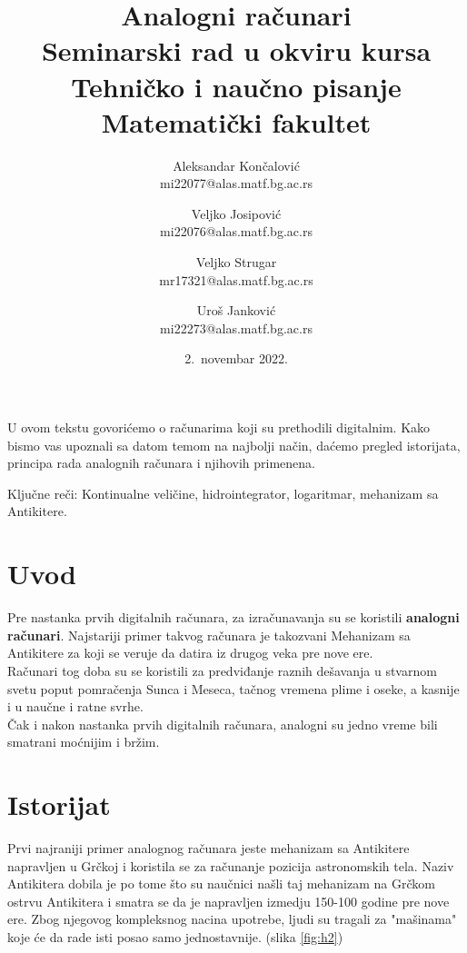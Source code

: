 \documentclass[a4paper]{article}
\begin{document}
\title{Analogni računari\\ \small{Seminarski rad u okviru kursa\\Tehničko i naučno pisanje\\ Matematički fakultet}}

\author{Aleksandar Končalović\\ mi22077@alas.matf.bg.ac.rs\and Veljko Josipović\\mi22076@alas.matf.bg.ac.rs\and Veljko Strugar\\mr17321@alas.matf.bg.ac.rs\and Uroš Janković\\mi22273@alas.matf.bg.ac.rs }
\date{2.~novembar 2022.}
\maketitle

\abstract{}
U ovom tekstu govorićemo o računarima koji su prethodili digitalnim. Kako bismo vas upoznali sa datom temom na najbolji način, daćemo pregled istorijata, principa rada analognih računara i njihovih primenena.

Ključne reči: Kontinualne veličine, hidrointegrator, logaritmar, mehanizam sa Antikitere.

\tableofcontents

\newpage

\section{Uvod}
\label{sec:uvod}
Pre nastanka prvih digitalnih računara, za izračunavanja su se koristili \textbf{analogni računari}. Najstariji primer takvog računara je takozvani Mehanizam sa Antikitere za koji se veruje da datira iz drugog veka pre nove ere. \cite{antikitera}\\
Računari tog doba su se koristili za predviđanje raznih dešavanja u stvarnom svetu poput pomračenja Sunca i Meseca, tačnog vremena plime i oseke, a kasnije i u naučne i ratne svrhe.\\
Čak i nakon nastanka prvih digitalnih računara, analogni su jedno vreme bili smatrani moćnijim i bržim.

\section{Istorijat}
\label{sec:naslovN}

Prvi najraniji primer analognog računara jeste mehanizam sa Antikitere napravljen u Grčkoj i koristila se za računanje pozicija astronomskih tela. Naziv Antikitera dobila je po tome što su naučnici našli taj mehanizam na Grčkom ostrvu Antikitera i smatra se da je napravljen izmedju 150-100 godine pre nove ere. Zbog njegovog kompleksnog nacina upotrebe, ljudi su tragali za "mašinama" koje će da rade isti posao samo jednostavnije. (slika \ref{fig:h2})
\end{document}
